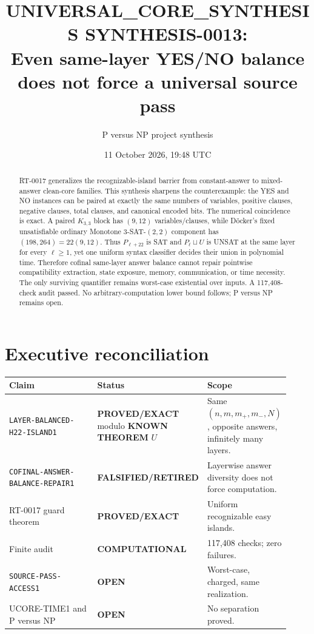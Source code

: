 \documentclass[11pt]{article}
\title{UNIVERSAL\_CORE\_SYNTHESIS SYNTHESIS-0013:\\
Even same-layer YES/NO balance does not force a universal source pass}
\author{P versus NP project synthesis}
\date{11 October 2026, 19:48 UTC}
\newcommand{\EXACT}{\textbf{PROVED/EXACT}}
\newcommand{\KNOWN}{\textbf{KNOWN THEOREM}}
\newcommand{\OPEN}{\textbf{OPEN}}
\newcommand{\RETIRED}{\textbf{FALSIFIED/RETIRED}}
\newcommand{\COMP}{\textbf{COMPUTATIONAL}}
\begin{document}
\maketitle

\begin{abstract}
RT-0017 generalizes the recognizable-island barrier from constant-answer to
mixed-answer clean-core families.  This synthesis sharpens the counterexample:
the YES and NO instances can be paired at exactly the same numbers of variables,
positive clauses, negative clauses, total clauses, and canonical encoded bits.
The numerical coincidence is exact.  A paired $K_{3,3}$ block has $(9,12)$
variables/clauses, while D\"ocker's fixed unsatisfiable ordinary Monotone
3-SAT-$(2,2)$ component has $(198,264)=22(9,12)$.  Thus $P_{\ell+22}$ is SAT
and $P_\ell\sqcup U$ is UNSAT at the same layer for every $\ell\ge1$, yet one
uniform syntax classifier decides their union in polynomial time.  Therefore
cofinal same-layer answer balance cannot repair pointwise compatibility
extraction, state exposure, memory, communication, or time necessity.  The
only surviving quantifier remains worst-case existential over inputs.  A
117,408-check audit passed.  No arbitrary-computation lower bound follows;
P versus NP remains open.
\end{abstract}

\section{Executive reconciliation}

\begin{center}\small
\begin{tabular}{@{}p{0.44\linewidth}p{0.19\linewidth}p{0.29\linewidth}@{}}
\toprule
Claim & Status & Scope\\ \midrule
\texttt{LAYER-BALANCED-H22-ISLAND1} & \EXACT{} modulo \KNOWN{} $U$ &
Same $(n,m,m_+,m_-,N)$, opposite answers, infinitely many layers.\\
\texttt{COFINAL-ANSWER-BALANCE-REPAIR1} & \RETIRED &
Layerwise answer diversity does not force computation.\\
RT-0017 guard theorem & \EXACT & Uniform recognizable easy islands.\\
Finite audit & \COMP & 117,408 checks; zero failures.\\
\texttt{SOURCE-PASS-ACCESS1} & \OPEN & Worst-case, charged, same realization.\\
UCORE-TIME1 and P versus NP & \OPEN & No separation proved.\\
\bottomrule
\end{tabular}
\end{center}
\end{document}
